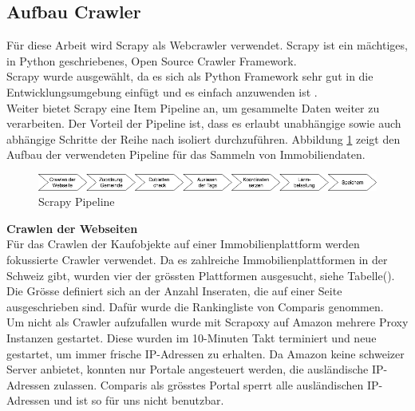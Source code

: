 \subsection{Aufbau Crawler}
Für diese Arbeit wird Scrapy als Webcrawler verwendet. Scrapy ist ein mächtiges, in Python geschriebenes, Open Source Crawler Framework.\\
Scrapy wurde ausgewählt, da es sich als Python Framework sehr gut in die Entwicklungsumgebung einfügt und es einfach anzuwenden ist \cite{scrapy}.\\
Weiter bietet Scrapy eine Item Pipeline an, um gesammelte Daten weiter zu verarbeiten. Der Vorteil der Pipeline ist, dass es erlaubt unabhängige sowie auch abhängige Schritte der Reihe nach isoliert durchzuführen. Abbildung \ref{fig:scrapy} zeigt den Aufbau der verwendeten Pipeline für das Sammeln von Immobiliendaten.\\[2ex]
\begin{figure}[h!]
\centering
\includegraphics[width=\textwidth]{images/scrapy.png}
\caption[Scrapy Pipeline]{Scrapy Pipeline}%
\label{fig:scrapy}
\end{figure}
\newline
%
\textbf{Crawlen der Webseiten}\\
Für das Crawlen der Kaufobjekte auf einer Immobilienplattform werden fokussierte Crawler verwendet. Da es zahlreiche Immobilienplattformen in der Schweiz gibt, wurden vier der grössten Plattformen ausgesucht, siehe Tabelle(). Die Grösse definiert sich an der Anzahl Inseraten, die auf einer Seite ausgeschrieben sind. Dafür wurde die Rankingliste von Comparis genommen.\\
Um nicht als Crawler aufzufallen wurde mit Scrapoxy auf Amazon mehrere Proxy Instanzen gestartet. Diese wurden im 10-Minuten Takt terminiert und neue gestartet, um immer frische IP-Adressen zu erhalten. Da Amazon keine schweizer Server anbietet, konnten nur Portale angesteuert werden, die ausländische IP-Adressen zulassen. Comparis als grösstes Portal sperrt alle ausländischen IP-Adressen und ist so für uns nicht benutzbar.
